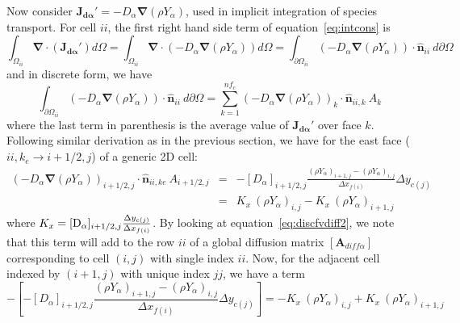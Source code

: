 \documentclass[12pt]{article}
\begin{document}
Now consider $ \mathbf{J_{d \alpha}'} = - D_\alpha \boldsymbol{\nabla} \left(\rho Y_\alpha \right)$, used in implicit integration of species transport. For cell $ii$, the first right hand side term of equation~\eqref{eq:intcons} is 
%
\begin{equation}
  \int_{\Omega_{ii}} { \boldsymbol{\nabla} \cdot \left(  \mathbf{J_{d \alpha}'} \right)  } d \Omega = 
  \int_{\Omega_{ii}} { \boldsymbol{\nabla} \cdot \left( -  D_\alpha \boldsymbol{\nabla} \left( \rho Y_\alpha \right) \right)  } d \Omega =
  \int_{\partial \Omega_{ii}} {\left( -  D_\alpha \boldsymbol{\nabla} \left( \rho Y_\alpha \right) \right) \cdot \hat{\mathbf{n}}_{ii} } \: d \partial \Omega 
\end{equation}
%
and in discrete form, we have
%
\begin{equation}
    \int_{\partial \Omega_{ii}} {\left( -  D_\alpha \boldsymbol{\nabla} \left( \rho Y_\alpha \right) \right) \cdot \hat{\mathbf{n}}_{ii} } \: d \partial \Omega = \sum^{nf_c}_{k=1} 
    \left( -  D_\alpha \boldsymbol{\nabla} \left( \rho Y_\alpha \right) \right)_k \cdot \hat{\mathbf{n}}_{ii,k} \: A_k \label{eq:discfvdiff2}
\end{equation}
%
where the last term in parenthesis is the average value of $ \mathbf{J_{d \alpha}'} $ over face $k$. Following similar derivation as in the previous section, we have for the east face ($ii,k_e \rightarrow i+1/2,j$) of a generic 2D cell:
%
\begin{eqnarray}
   \left( - D_\alpha \boldsymbol{\nabla} \left( \rho Y_\alpha \right) \right)_{i+1/2,j} \cdot \hat{\mathbf{n}}_{ii,ke} \: A_{i+1/2,j} & = &  
   -[D_\alpha]_{i+1/2,j} \frac{ \left( \rho Y_\alpha \right)_{i+1,j} - \left( \rho Y_\alpha \right)_{i,j} } {\Delta x_{f(i)}} \Delta y_{c(j)}  \nonumber \\
   & = &  K_x \:\left( \rho Y_\alpha \right)_{i,j}-K_x \: \left( \rho Y_\alpha \right)_{i+1,j} \label{eq:diffii2}
\end{eqnarray} 
where $K_x=[\mbox{D}_\alpha]_{i+1/2,j} \frac{\Delta y_{c(j)}}{\Delta x_{f(i)}}$. By looking at equation~\eqref{eq:discfvdiff2}, we note that this term will add to the row $ii$ of a global diffusion matrix $\left[ \mathbf{A}_{diff \alpha} \right]$ corresponding to cell $(i,j)$ with single index $ii$. Now, for the adjacent cell indexed by $(i+1,j)$ with unique index $jj$, we have a term
%
\begin{equation}
   - \left[ -[D_\alpha]_{i+1/2,j} \frac{\left( \rho Y_\alpha \right)_{i+1,j} - \left( \rho Y_\alpha \right)_{i,j}}{\Delta x_{f(i)}} \Delta y_{c(j)} \right] = -K_x \: \left( \rho Y_\alpha \right)_{i,j}+K_x \: \left( \rho Y_\alpha \right)_{i+1,j} \label{eq:diffjj2}
\end{equation}
\end{document}

